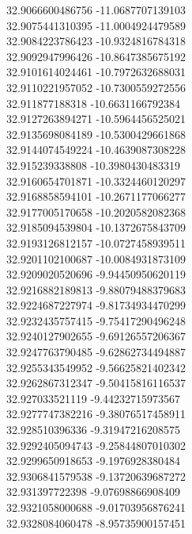 {32.9066600486756	-11.0687707139103\\
32.9075441310395	-11.0004924479589\\
32.9084223786423	-10.9324816784318\\
32.9092947996426	-10.8647385675192\\
32.9101614024461	-10.7972632688031\\
32.9110221957052	-10.7300559272556\\
32.911877188318	-10.6631166792384\\
32.9127263894271	-10.5964456525021\\
32.9135698084189	-10.5300429661868\\
32.9144074549224	-10.4639087308228\\
32.915239338808	-10.3980430483319\\
32.9160654701871	-10.3324460120297\\
32.9168858594101	-10.2671177066277\\
32.9177005170658	-10.2020582082368\\
32.9185094539804	-10.1372675843709\\
32.9193126812157	-10.0727458939511\\
32.9201102100687	-10.0084931873109\\
32.9209020520696	-9.94450950620119\\
32.9216882189813	-9.88079488379683\\
32.9224687227974	-9.81734934470299\\
32.9232435757415	-9.75417290496248\\
32.9240127902655	-9.69126557206367\\
32.9247763790485	-9.62862734494887\\
32.9255343549952	-9.56625821402342\\
32.9262867312347	-9.50415816116537\\
32.927033521119	-9.44232715973567\\
32.9277747382216	-9.38076517458911\\
32.928510396336	-9.31947216208575\\
32.9292405094743	-9.25844807010302\\
32.9299650918653	-9.1976928380484\\
32.9306841579538	-9.13720639687272\\
32.931397722398	-9.07698866908409\\
32.9321058000688	-9.01703956876241\\
32.9328084060478	-8.95735900157451\\
}
